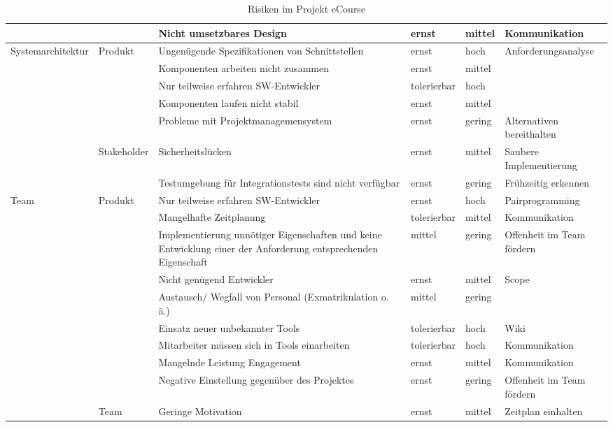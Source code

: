 \begin{table}
\begin{tabularx}{\textwidth}{|l|l|X|l|l|X|}
\hline
 &  & Nicht umsetzbares Design & ernst & mittel & Kommunikation  \\ 
\hline
Systemarchitektur & Produkt & Ungenügende Spezifikationen von Schnittstellen & ernst & hoch & Anforderungsanalyse \\ 
\hline
 &  & Komponenten arbeiten nicht zusammen & ernst & mittel &  \\ 
\hline
 &  & Nur teilweise erfahren SW-Entwickler & tolerierbar & hoch &  \\ 
\hline
 &  & Komponenten laufen nicht stabil & ernst & mittel &  \\ 
\hline
 &  & Probleme mit Projektmanagemensystem & ernst & gering & Alternativen bereithalten \\ 
\hline
 & Stakeholder & Sicherheitslücken & ernst & mittel & Saubere Implementierung \\ 
\hline
 &  & Testumgebung für Integrationstests sind nicht verfügbar & ernst & gering & Frühzeitig erkennen \\ 
\hline
Team & Produkt & Nur teilweise erfahren SW-Entwickler & ernst & hoch & Pairprogramming \\ 
\hline
 &  & Mangelhafte Zeitplanung & tolerierbar & mittel & Kommunikation  \\ 
\hline
 &  & Implementierung unnötiger Eigenschaften und keine Entwicklung einer der Anforderung entsprechenden Eigenschaft & mittel & gering & Offenheit im Team fördern \\ 
\hline
 &  & Nicht genügend Entwickler & ernst & mittel & Scope  \\ 
\hline
 &  & Austausch/ Wegfall von Personal (Exmatrikulation o. ä.) & mittel & gering &  \\ 
\hline
 &  & Einsatz neuer unbekannter Tools & tolerierbar & hoch & Wiki \\ 
\hline
 &  & Mitarbeiter müssen sich in Tools einarbeiten & tolerierbar & hoch & Kommunikation  \\ 
\hline
 &  & Mangelnde Leistung Engagement & ernst & mittel & Kommunikation \\ 
\hline
 &  & Negative Einstellung gegenüber des Projektes & ernst & gering & Offenheit im Team fördern \\ 
\hline
 & Team & Geringe Motivation & ernst & mittel & Zeitplan einhalten \\ 
\hline
\end{tabularx}
\caption{Risiken im Projekt eCourse}
\label{tab:Risiken}
\end{table}
